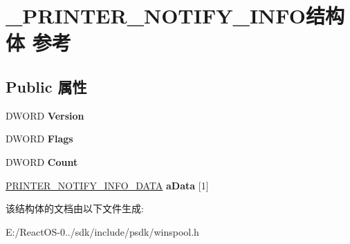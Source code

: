 \hypertarget{struct___p_r_i_n_t_e_r___n_o_t_i_f_y___i_n_f_o}{}\section{\+\_\+\+P\+R\+I\+N\+T\+E\+R\+\_\+\+N\+O\+T\+I\+F\+Y\+\_\+\+I\+N\+F\+O结构体 参考}
\label{struct___p_r_i_n_t_e_r___n_o_t_i_f_y___i_n_f_o}
\subsection*{Public 属性}
\begin{DoxyCompactItemize}
\item 
\mbox{\label{struct___p_r_i_n_t_e_r___n_o_t_i_f_y___i_n_f_o_a9a1cdad300f2295ae5a2a9e49c46c7a4}} 
D\+W\+O\+RD {\bfseries Version}
\item 
\mbox{\label{struct___p_r_i_n_t_e_r___n_o_t_i_f_y___i_n_f_o_a411f0219b9f16ae636204de0ac28afa0}} 
D\+W\+O\+RD {\bfseries Flags}
\item 
\mbox{\label{struct___p_r_i_n_t_e_r___n_o_t_i_f_y___i_n_f_o_aa4d43e399259d88630e129b3b25cc0f7}} 
D\+W\+O\+RD {\bfseries Count}
\item 
\mbox{\label{struct___p_r_i_n_t_e_r___n_o_t_i_f_y___i_n_f_o_a1c98b27ce5b3996661568f91f9b831f6}} 
\hyperlink{struct___p_r_i_n_t_e_r___n_o_t_i_f_y___i_n_f_o___d_a_t_a}{P\+R\+I\+N\+T\+E\+R\+\_\+\+N\+O\+T\+I\+F\+Y\+\_\+\+I\+N\+F\+O\+\_\+\+D\+A\+TA} {\bfseries a\+Data} \mbox{[}1\mbox{]}
\end{DoxyCompactItemize}


该结构体的文档由以下文件生成\+:\begin{DoxyCompactItemize}
\item 
E\+:/\+React\+O\+S-\/0../sdk/include/psdk/winspool.\+h\end{DoxyCompactItemize}

